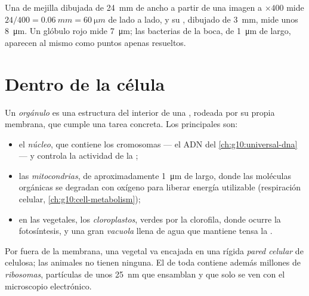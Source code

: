 \begin{example}\label{ex:g10:cells-common-unit:cheek}
Una  de mejilla dibujada de \qty{24}{mm} de ancho a partir de una
imagen a $\times 400$ mide $24/400 = \qty{0.06}{mm} = \qty{60}{\micro m}$
de lado a lado, y su , dibujado de \qty{3}{mm}, mide unos
\qty{8}{\micro m}. Un glóbulo rojo mide \qty{7}{\micro m}; las bacterias
de la boca, de \qty{1}{\micro m} de largo, aparecen al mismo 
como puntos apenas resueltos.
\end{example}

\section{Dentro de la célula}

\begin{definition}[Orgánulo]\label{def:g10:cells-common-unit:organelle}
Un \emph{orgánulo} es una estructura del interior de
una , rodeada por su propia membrana, que cumple una tarea
concreta. Los principales son:
\begin{itemize}
  \item el \emph{núcleo}, que contiene los cromosomas ---
        el ADN del \cref{ch:g10:universal-dna} --- y controla la
        actividad de la ;
  \item las \emph{mitocondrias}, de aproximadamente
        \qty{1}{\micro m} de largo, donde las moléculas orgánicas se
        degradan con oxígeno para liberar energía utilizable
        (respiración celular, \cref{ch:g10:cell-metabolism});
  \item en las  vegetales, los \emph{cloroplastos},
        verdes por la clorofila, donde ocurre la fotosíntesis, y una
        gran \emph{vacuola} llena de agua que mantiene
        tensa la .
\end{itemize}
Por fuera de la membrana, una  vegetal va encajada en una rígida
\emph{pared celular} de celulosa; las 
animales no tienen ninguna. El  de toda  contiene
además millones de \emph{ribosomas}, partículas de unos
\qty{25}{nm} que ensamblan  y que solo se ven con el
microscopio electrónico.
\end{definition}

